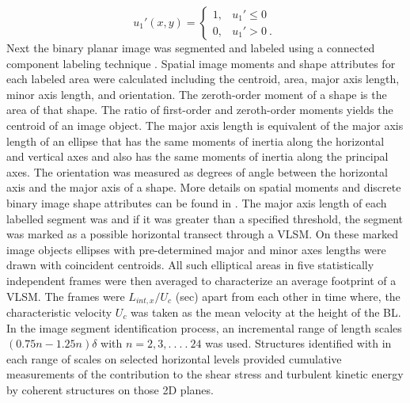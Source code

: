 \documentclass{amsart}
\begin{document}
\begin{equation}
	u_{1}'(x,y) = \begin{cases}	
	1, &\text{$u_{1}' \leq 0$ }\\
	0, &\text{$u_{1}' >  0$}\ .
	\end{cases}
	\label{case:binary-vel}
\end{equation}
\noindent Next the binary planar image was segmented and labeled using a connected component labeling technique \cite{book_comp_vision_davies}. Spatial image moments and shape attributes for each labeled area were calculated including the centroid, area, major axis length, minor axis length, and orientation. The zeroth-order moment of a shape is the area of that shape. The ratio of first-order and zeroth-order moments yields the centroid of an image object. The major axis length is equivalent of the major axis length of an ellipse that has the same moments of inertia along the horizontal and vertical axes and also has the same moments of inertia along the principal axes. The orientation was measured as degrees of angle between the horizontal axis and the major axis of a shape.  More details on spatial moments and discrete binary image shape attributes can be found in \citet{book_intro_dimg_proc_pratt}. The major axis length of each labelled segment was and if it was greater than a specified threshold, the segment was marked as a possible horizontal transect through a VLSM. On these marked image objects ellipses with pre-determined major and minor axes lengths were drawn with coincident centroids. All such elliptical areas in five statistically independent frames were then averaged to characterize an  average footprint of a VLSM. The frames were $L_{int,x}/U_c$ (sec) apart from each other in time where, the characteristic velocity $U_c$ was taken as the mean velocity at the height of the BL.  In the image segment identification process, an incremental range of length scales $(0.75n-1.25n)\delta $ with $n= 2,3,.\ .\  .\  . \ 24$ was used.  Structures identified with in each  range of scales on selected horizontal levels provided cumulative measurements of the contribution to the shear stress and turbulent kinetic energy by coherent structures on those 2D planes.
\end{document}
